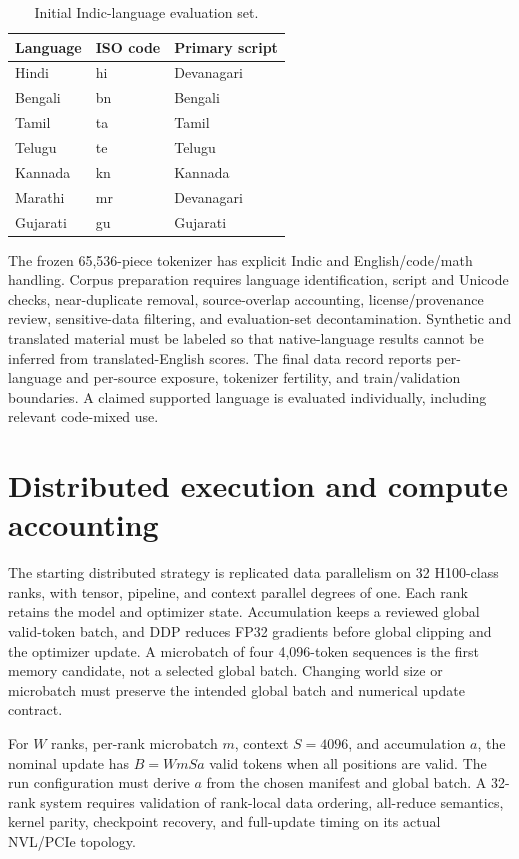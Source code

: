 \documentclass[11pt]{article}
\begin{document}
\begin{table}[ht]
\centering
\caption{Initial Indic-language evaluation set.}
\label{tab:languages}
\small
\begin{tabular}{@{}lll@{}}
\toprule
Language & ISO code & Primary script \\
\midrule
Hindi & hi & Devanagari \\
Bengali & bn & Bengali \\
Tamil & ta & Tamil \\
Telugu & te & Telugu \\
Kannada & kn & Kannada \\
Marathi & mr & Devanagari \\
Gujarati & gu & Gujarati \\
\bottomrule
\end{tabular}
\end{table}

The frozen 65,536-piece tokenizer has explicit Indic and English/code/math
handling. Corpus preparation requires language identification, script and
Unicode checks, near-duplicate removal, source-overlap accounting,
license/provenance review, sensitive-data filtering, and evaluation-set
decontamination. Synthetic and translated material must be labeled so that
native-language results cannot be inferred from translated-English scores.
The final data record reports per-language and per-source exposure,
tokenizer fertility, and train/validation boundaries. A claimed supported
language is evaluated individually, including relevant code-mixed use.

\section{Distributed execution and compute accounting}

The starting distributed strategy is replicated data parallelism on 32
H100-class ranks, with tensor, pipeline, and context parallel degrees of
one. Each rank retains the model and optimizer state. Accumulation keeps a
reviewed global valid-token batch, and DDP reduces FP32 gradients before
global clipping and the optimizer update. A microbatch of four 4,096-token
sequences is the first memory candidate, not a selected global batch.
Changing world size or microbatch must preserve the intended global batch
and numerical update contract.

For $W$ ranks, per-rank microbatch $m$, context $S=4096$, and accumulation
$a$, the nominal update has $B=WmSa$ valid tokens when all positions are
valid. The run configuration must derive $a$ from the chosen manifest and
global batch. A 32-rank system requires validation of rank-local data
ordering, all-reduce semantics, kernel parity, checkpoint recovery, and
full-update timing on its actual NVL/PCIe topology.
\end{document}
